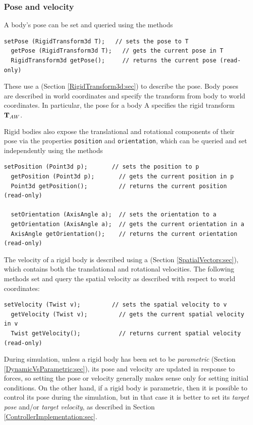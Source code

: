 \subsubsection{Pose and velocity}

A body's pose can be set and
queried using the methods
%
\begin{lstlisting}[]
  setPose (RigidTransform3d T);   // sets the pose to T
  getPose (RigidTransform3d T);   // gets the current pose in T
  RigidTransform3d getPose();     // returns the current pose (read-only)
\end{lstlisting}
%
These use a  (Section
\ref{RigidTransform3d:sec}) to describe the pose. Body poses are
described in world coordinates and specify the transform from body to
world coordinates. In particular, the pose for a body A specifies
the rigid transform ${\bf T}_{AW}$.

Rigid bodies also expose the translational and rotational components of
their pose via the properties {\tt position} and {\tt orientation},
which can be queried and set independently using the methods
%
\begin{lstlisting}[]
  setPosition (Point3d p);       // sets the position to p
  getPosition (Point3d p);       // gets the current position in p
  Point3d getPosition();         // returns the current position (read-only)

  setOrientation (AxisAngle a);  // sets the orientation to a
  getOrientation (AxisAngle a);  // gets the current orientation in a
  AxisAngle getOrientation();    // returns the current orientation (read-only)
\end{lstlisting}
%

The velocity of a rigid body is described using a
 (Section
\ref{SpatialVectors:sec}), which contains both the translational and
rotational velocities. The following methods
set and query the spatial velocity as described with respect to world
coordinates:
%
\begin{lstlisting}[]
  setVelocity (Twist v);         // sets the spatial velocity to v
  getVelocity (Twist v);         // gets the current spatial velocity in v
  Twist getVelocity();           // returns current spatial velocity (read-only)
\end{lstlisting}
%

During simulation, unless a rigid body has been set to be {\it
parametric} (Section \ref{DynamicVsParametric:sec}), its pose and
velocity are updated in response to forces, so setting the pose or
velocity generally makes sense only for setting initial conditions.
On the other hand, if a rigid body is parametric, then it is possible
to control its pose during the simulation, but in that case it is
better to set its {\it target pose} and/or {\it target velocity}, as
described in Section \ref{ControllerImplementation:sec}.

